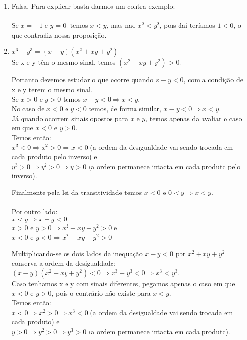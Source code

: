 \documentclass[10pt]{book}
\begin{document}
\begin{enumerate}
\begin{enumerate}
		\end{enumerate}
	\item %
	Falsa. Para explicar basta darmos um contra-exemplo: 
	\paragraph{}Se $x = -1$ e $y = 0$, temos $x < y$, mas não $x^2 < y^2$, pois daí teríamos $1 < 0$, o que contradiz nossa proposição.
	\item 
	$x^3  - y^3 = (x - y)(x^2 + xy + y^2)$\\
	Se x e y têm o mesmo sinal, temos $(x^2 + xy + y^2) > 0$.
	
	Portanto devemos estudar o que ocorre quando $x - y < 0$, com a condição de x e y terem o mesmo sinal.\\
	Se $x > 0$ e $y > 0$ temos $x - y < 0 \Rightarrow x < y$.\\
	No caso de $x < 0$ e $y < 0$ temos, de forma similar, $x - y < 0 \Rightarrow x < y$.\\
	Já quando ocorrem sinais opostos para $x$ e $y$, temos apenas da avaliar o caso em que $x < 0$ e $y > 0$.\\
	Temos então:\\
	$x^3 < 0 \Rightarrow x^2 > 0 \Rightarrow x < 0$ (a ordem da desigualdade vai sendo trocada em cada produto pelo inverso) e\\
	$y^3 > 0 \Rightarrow y^2 > 0 \Rightarrow y > 0$ (a ordem permanece intacta em cada produto pelo inverso).
	
	Finalmente pela lei da transitividade temos $x < 0$ e $0 < y \Rightarrow x < y$.
	\\\\
	Por outro lado:\\
	$x < y \Rightarrow x - y < 0$\\
	$x > 0$ e $y > 0 \Rightarrow x^2 + xy + y^2 > 0$ e\\
    $x < 0$ e $y < 0	\Rightarrow  x^2 + xy + y^2 > 0$
	
	Multiplicando-se os dois lados da inequação $x - y < 0$ por $x^2 + xy + y^2$ conserva a ordem da desigualdade:\\
	$(x - y)(x^2 + xy + y^2) < 0 \Rightarrow x^3 - y^3 < 0 \Rightarrow x^3 < y^3$.\\
	Caso tenhamos x e y com sinais diferentes, pegamos apenas o caso em que $x < 0$ e $y > 0$, pois o contrário não existe para $x < y$.\\
	Temos então:\\
	$x < 0 \Rightarrow x^2 > 0 \Rightarrow x^3 < 0$ (a ordem da desigualdade vai sendo trocada em cada produto) e\\
	$y > 0 \Rightarrow y^2 > 0 \Rightarrow y^3 > 0$ (a ordem permanece intacta em cada produto).
	

\end{enumerate}
\end{document}
